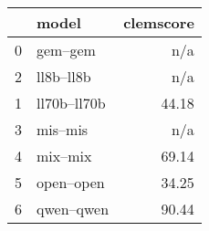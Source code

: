 \begin{tabular}{llr}
\toprule
 & model & clemscore \\
\midrule
0 & gem--gem & n/a \\
2 & ll8b--ll8b & n/a \\
1 & ll70b--ll70b & 44.18 \\
3 & mis--mis & n/a \\
4 & mix--mix & 69.14 \\
5 & open--open & 34.25 \\
6 & qwen--qwen & 90.44 \\
\bottomrule
\end{tabular}
